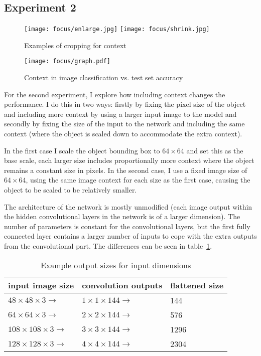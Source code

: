 \subsection {Experiment 2}

\begin{figure}[t]
    \caption{Examples of cropping for context}
\centering
\texttt{[image: focus/enlarge.jpg]}
\texttt{[image: focus/shrink.jpg]}
\label{fig:focus_context}
\end{figure}




\begin{figure}[h]
    \caption{Context in image classification vs. test set accuracy}
\centering
\texttt{[image: focus/graph.pdf]}
\label{fig:focus_exp2}
\end{figure}

For the second experiment, I explore how including context changes the performance. I do this in two ways: firstly by fixing the pixel size of the object and including more context by using a larger input image to the model and secondly by fixing the size of the input to the network and including the same context (where the object is scaled down to accommodate the extra context).

In the first case I scale the object bounding box to $ 64 \times 64 $ and set this as the base scale, each larger size includes proportionally more context where the object remains a constant size in pixels. In the second case, I use a fixed image size of $ 64 \times 64 $, using the same image context for each size as the first case, causing the object to be scaled to be relatively smaller. 

The architecture of the network is mostly unmodified (each image output within the hidden convolutional layers in the network is of a larger dimension). The number of parameters is constant for the convolutional layers, but the first fully connected layer contains a larger number of inputs to cope with the extra outputs from the convolutional part. The differences can be seen in table~\ref{fig:focus_sizes}.


\begin{table}[h]
  \centering
    \caption{Example output sizes for input dimensions }
\begin{tabular}{ l l l } 
 
 \toprule
 input image size & convolution outputs & flattened size \\
 \toprule
 
 $ 48 \times 48 \times 3 \rightarrow $ & $ 1\times1\times144 \rightarrow $ & 144 \\
 $ 64 \times 64 \times 3 \rightarrow $ & $ 2\times2\times144 \rightarrow $ & 576 \\
 $ 108 \times 108 \times 3 \rightarrow $ & $ 3\times3\times144 \rightarrow $ & 1296 \\
 $ 128 \times 128 \times 3 \rightarrow $ & $ 4\times4\times144 \rightarrow $ & 2304 \\
 
\end{tabular}
\label{fig:focus_sizes}
\end{table}

